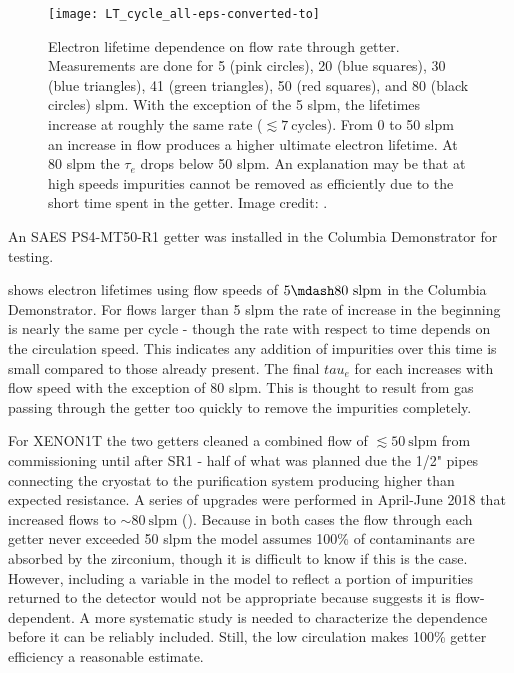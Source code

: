\begin{figure}
\centering
\texttt{[image: LT\_cycle\_all-eps-converted-to]}
\caption{Electron lifetime dependence on flow rate through getter.  Measurements are done for 5 (pink circles), 20 (blue squares), 30
(blue
triangles), 41 (green triangles), 50 (red squares), and 80 (black circles) slpm.  With the exception of the 5 slpm, the lifetimes increase
at roughly the same rate ($\lesssim 7\ \mathrm{cycles}$).  From 0 to 50 slpm an increase in flow produces a higher ultimate electron
lifetime.  At 80 slpm the $\tau_e$ drops below 50 slpm.  An explanation may be that at high speeds impurities cannot be removed as
efficiently due to the short time spent in the getter.  Image credit: .}
\label{fig:electron_lifetime_model_removal_demonstrator_circ}
\end{figure}

An SAES PS4-MT50-R1 getter was installed in the Columbia Demonstrator for testing.

 shows electron lifetimes using flow speeds of $5 \mdash 80\ \mathrm{slpm}$
in the Columbia Demonstrator.  For flows larger than 5 slpm the rate of increase in the beginning is nearly the same per cycle - though
the rate with respect to time depends on the circulation speed.  This indicates any addition of impurities over this time is small
compared to those already present.  The final $tau_e$ for each increases with flow speed with the exception of 80 slpm.  This is thought
to result from gas passing through the getter too quickly to remove the impurities completely.

For XENON1T the two getters cleaned a combined flow of $\lesssim 50\ \mathrm{slpm}$ from commissioning until after SR1 - half of what was
planned due the 1/2" pipes connecting the cryostat to the purification system producing higher than expected resistance.  A series of
upgrades were performed in April-June 2018 that increased flows to ${\sim} 80\ \mathrm{slpm}$ (\secref{}).  Because in both cases the
flow through each getter never exceeded 50 slpm the model assumes 100\% of contaminants are absorbed by the zirconium, though it is
difficult to know if this is the case.  However, including a variable in the model to reflect a portion of impurities returned
to the detector would not be appropriate because  suggests it is
flow-dependent.  A more systematic study is needed to characterize the dependence before it can be reliably included.  Still, the low
circulation makes 100\% getter efficiency a reasonable estimate.

